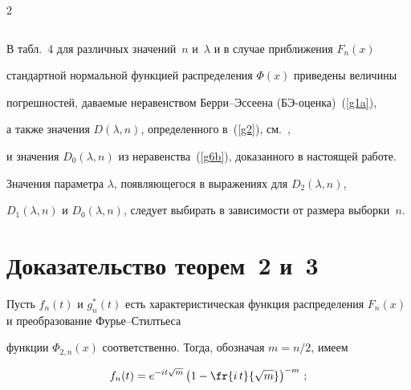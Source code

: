 \begin{multicols}{2}
\begin{center}
{\begin{tabular}{|c|c||c|c||c|c|}
\hline 


\end{tabular}


}


\end{center}


\vspace*{9pt}





\smallskip


\addtocounter{table}{1}





В табл.~4 для различных значений~$n$ и~$\lambda$ и в случае приближения $F_n(x)$  


стандартной нормальной функцией распределения   $\Phi(x)$ приведены  величины 


погрешностей, даваемые неравенством Берри--Эссеена (БЭ-оцен\-ка)~(\ref{g1a}), 


а также значения $D(\lambda,n)$, определенного в~(\ref{g2}), см.~\cite{5-cr}, 


и значения $D_0(\lambda,n)$ из неравенства~(\ref{g6b}), доказанного в настоящей работе.








Значения параметра  $\lambda$, появляющегося в выражениях для   $D_2(\lambda, n)$, 


$D_1(\lambda, n)$ и $D_0(\lambda, n)$, следует выбирать в зависимости от размера выборки~$n$.





\section{Доказательство теорем~2 и~3}





Пусть $f_n(t)$ и $g^*_n(t)$ есть характеристическая функция распределения   $F_n(x)$ и преобразование Фурье--Стил\-тье\-са 


функции   $\Phi_{2,n}(x)$ соответственно. Тогда, обозначая   $m=n/2$, имеем


\begin{align*}


 f_n(t) &= e^{-it\sqrt{m}}\left(1-\fr{i\,t}{\sqrt{m}}\right)^{-m}\,;


\\



\end{align*}
\end{multicols}
